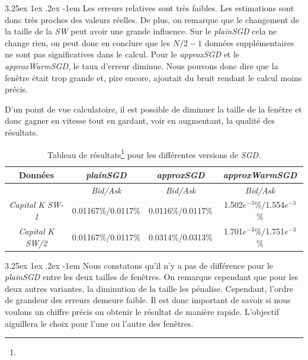 \documentclass[a4paper, 11pt]{article}
\makeatletter
\renewcommand\paragraph{\@startsection{paragraph}{5}{\z@}%
  {3.25ex \@plus1ex \@minus.2ex}%
  {-1em}%
  {\normalfont\normalsize\bfseries}}
\makeatother
\begin{document}
\paragraph{}
Les erreurs relatives sont très faibles. Les estimations sont donc très proches des valeurs réelles. De plus, on
remarque que le  changement de la taille de la \textit{SW} peut avoir une grande influence. Sur le \textit{plainSGD}
cela ne change rien, on peut donc en conclure que les $N/2 - 1$ données supplémentaires ne sont pas significatives
dans le calcul. Pour le \textit{approxSGD} et le \textit{approxWarmSGD}, le taux d'erreur diminue. Nous pouvons donc
dire que la fenêtre était trop grande et, pire encore, ajoutait du bruit rendant le calcul moins précis.

D'un point de vue calculatoire, il est possible de diminuer la taille de la fenêtre et
donc gagner en vitesse tout en gardant, voir en augmentant, la qualité des résultats.


\begin{table}[H]
	\centering
\begin{tabular}{|c|c|c|c|}
	\hline
	Données & \textit{plainSGD} & \textit{approxSGD} & \textit{approxWarmSGD}\\
	\hline
	\ & \textit{Bid/Ask} & \textit{Bid/Ask} & \textit{Bid/Ask} \\
	\hline
	\textit{Capital K SW-1} & 0.01167\%/0.0117\% & 0.0116\%/0.0117\% & 1.502$e^{-3}$\%/1.554$e^{-3}$\% \\
	\hline
	\textit{Capital K SW/2} & 0.01167\%/0.0117\% & 0.0314\%/0.0313\% & 1.701$e^{-3}$\%/1.751$e^{-3}$\%\\
	\hline

\end{tabular}
\label{table_forex_singapore_2}
\caption[]{Tableau de résultats\footnote{} pour les différentes versions de \textit{SGD}.}
\end{table}


\paragraph{}
Nous constatons qu'il n'y a pas de différence pour le \textit{plainSGD} entre les deux tailles de fenêtres. On
remarque cependant que pour les deux autres variantes, la diminution de la taille les pénalise. Cependant, l'ordre
de grandeur des erreurs demeure faible. Il est donc important de savoir si nous voulons un chiffre précis ou obtenir
le résultat de manière rapide. L'objectif aiguillera le choix pour l'une ou l'autre des fenêtres.
\end{document}
